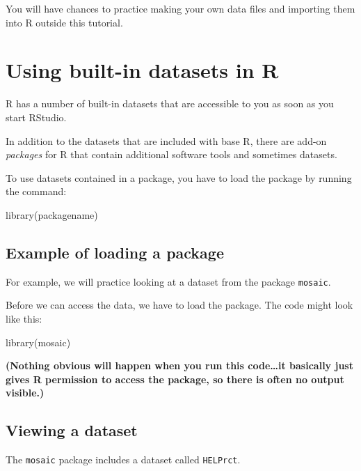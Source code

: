 \documentclass[
  letterpaper,
  DIV=11,
  numbers=noendperiod]{scrreprt}
\newenvironment{Shaded}{\begin{snugshade}}{\end{snugshade}}
\newcommand{\FunctionTok}[1]{\textcolor[rgb]{0.28,0.35,0.67}{#1}}
\newcommand{\NormalTok}[1]{\textcolor[rgb]{0.00,0.23,0.31}{#1}}
\theoremstyle{remark}
\begin{document}
You will have chances to practice making your own data files and
importing them into R outside this tutorial.

\section{Using built-in datasets in
R}\label{using-built-in-datasets-in-r}

R has a number of built-in datasets that are accessible to you as soon
as you start RStudio.

In addition to the datasets that are included with base R, there are
add-on \emph{packages} for R that contain additional software tools and
sometimes datasets.

To use datasets contained in a package, you have to load the package by
running the command:

\begin{Shaded}
\begin{Highlighting}[]
\FunctionTok{library}\NormalTok{(packagename) }
\end{Highlighting}
\end{Shaded}

\subsection{Example of loading a
package}\label{example-of-loading-a-package}

For example, we will practice looking at a dataset from the package
\texttt{mosaic}.

Before we can access the data, we have to load the package. The code
might look like this:

\begin{Shaded}
\begin{Highlighting}[]
\FunctionTok{library}\NormalTok{(mosaic)}
\end{Highlighting}
\end{Shaded}

\textbf{(Nothing obvious will happen when you run this code\ldots it
basically just gives R permission to access the package, so there is
often no output visible.)}

\subsection{Viewing a dataset}\label{viewing-a-dataset}

The \texttt{mosaic} package includes a dataset called \texttt{HELPrct}.
\end{document}
